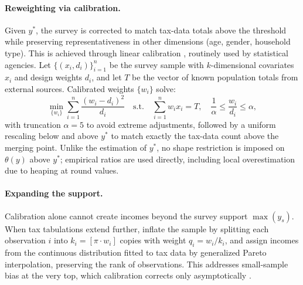 \paragraph{Reweighting via calibration.}\label{sec:bfm-reweighting}
Given $y^{*}$, the survey is corrected to match tax-data totals above the threshold while preserving representativeness in other dimensions (age, gender, household type). This is achieved through linear calibration \citep{DevilleSarndal1992}, routinely used by statistical agencies. Let $\{(x_{i}, d_{i})\}_{i=1}^{n}$ be the survey sample with $k$-dimensional covariates $x_{i}$ and design weights $d_{i}$, and let $T$ be the vector of known population totals from external sources. Calibrated weights $\{w_{i}\}$ solve:
\begin{equation}
    \min_{\{w_{i}\}} \sum_{i=1}^{n} \frac{(w_{i}-d_{i})^{2}}{d_{i}} \quad \text{s.t.} \quad \sum_{i=1}^{n} w_{i} x_{i} = T, \quad \frac{1}{\alpha} \le \frac{w_{i}}{d_{i}} \le \alpha,
    \label{eq:calibration}
\end{equation}
with truncation $\alpha=5$ to avoid extreme adjustments, followed by a uniform rescaling below and above $y^{*}$ to match exactly the tax-data count above the merging point. Unlike the estimation of $y^{*}$, no shape restriction is imposed on $\theta(y)$ above $y^{*}$; empirical ratios are used directly, including local overestimation due to heaping at round values.

\paragraph{Expanding the support.}
Calibration alone cannot create incomes beyond the survey support $\max(y_{s})$. When tax tabulations extend further, \citet{blanchet2022weight} inflate the sample by splitting each observation $i$ into $k_{i}=[\pi \cdot w_{i}]$ copies with weight $q_{i}=w_{i}/k_{i}$, and assign incomes from the continuous distribution fitted to tax data by generalized Pareto interpolation, preserving the rank of observations. This addresses small-sample bias at the very top, which calibration corrects only asymptotically \citep{DevilleSarndal1992}.

